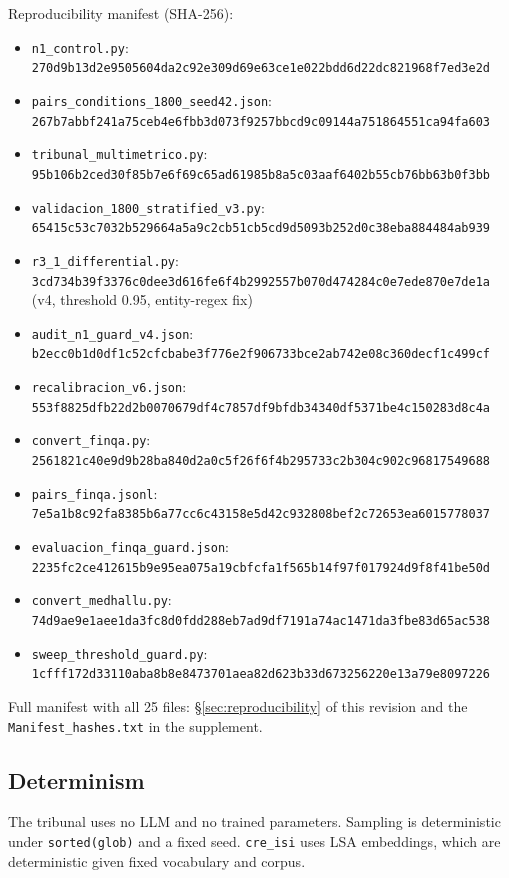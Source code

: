\documentclass[11pt,a4paper]{article}
\begin{document}
Reproducibility manifest (SHA-256):
\begin{itemize}
    \item \texttt{n1\_control.py}: \texttt{270d9b13d2e9505604da2c92e309d69e63ce1e022bdd6d22dc821968f7ed3e2d}
    \item \texttt{pairs\_conditions\_1800\_seed42.json}: \texttt{267b7abbf241a75ceb4e6fbb3d073f9257bbcd9c09144a751864551ca94fa603}
    \item \texttt{tribunal\_multimetrico.py}: \texttt{95b106b2ced30f85b7e6f69c65ad61985b8a5c03aaf6402b55cb76bb63b0f3bb}
    \item \texttt{validacion\_1800\_stratified\_v3.py}: \texttt{65415c53c7032b529664a5a9c2cb51cb5cd9d5093b252d0c38eba884484ab939}
    \item \texttt{r3\_1\_differential.py}: \texttt{3cd734b39f3376c0dee3d616fe6f4b2992557b070d474284c0e7ede870e7de1a} (v4, threshold 0.95, entity-regex fix)
    \item \texttt{audit\_n1\_guard\_v4.json}: \texttt{b2ecc0b1d0df1c52cfcbabe3f776e2f906733bce2ab742e08c360decf1c499cf}
    \item \texttt{recalibracion\_v6.json}: \texttt{553f8825dfb22d2b0070679df4c7857df9bfdb34340df5371be4c150283d8c4a}
        \item \texttt{convert\_finqa.py}: \texttt{2561821c40e9d9b28ba840d2a0c5f26f6f4b295733c2b304c902c96817549688} 
    \item \texttt{pairs\_finqa.jsonl}: \texttt{7e5a1b8c92fa8385b6a77cc6c43158e5d42c932808bef2c72653ea6015778037}
    \item \texttt{evaluacion\_finqa\_guard.json}: \texttt{2235fc2ce412615b9e95ea075a19cbfcfa1f565b14f97f017924d9f8f41be50d}
    \item \texttt{convert\_medhallu.py}: \texttt{74d9ae9e1aee1da3fc8d0fdd288eb7ad9df7191a74ac1471da3fbe83d65ac538}
    \item \texttt{sweep\_threshold\_guard.py}: \texttt{1cfff172d33110aba8b8e8473701aea82d623b33d673256220e13a79e8097226}
\end{itemize}
Full manifest with all 25 files: \S\ref{sec:reproducibility} of this revision and the \texttt{Manifest\_hashes.txt} in the supplement.

\subsection{Determinism}
The tribunal uses no LLM and no trained parameters. Sampling is deterministic under \texttt{sorted(glob)} and a fixed seed. \texttt{cre\_isi} uses LSA embeddings, which are deterministic given fixed vocabulary and corpus.
\end{document}

